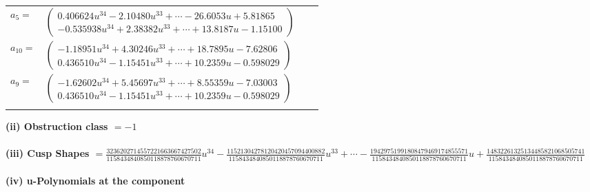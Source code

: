\documentclass[1p]{elsarticle_modified}
\theoremstyle{definition}
\begin{document}
\begin{tabular}{m{7pt} m{180pt} m{7pt} m{180pt} }
\flushright $a_{5}=$&$\begin{pmatrix}0.406624 u^{34}-2.10480 u^{33}+\cdots-26.6053 u+5.81865\\-0.535938 u^{34}+2.38382 u^{33}+\cdots+13.8187 u-1.15100\end{pmatrix}$ \\
\flushright $a_{10}=$&$\begin{pmatrix}-1.18951 u^{34}+4.30246 u^{33}+\cdots+18.7895 u-7.62806\\0.436510 u^{34}-1.15451 u^{33}+\cdots+10.2359 u-0.598029\end{pmatrix}$ \\
\flushright $a_{9}=$&$\begin{pmatrix}-1.62602 u^{34}+5.45697 u^{33}+\cdots+8.55359 u-7.03003\\0.436510 u^{34}-1.15451 u^{33}+\cdots+10.2359 u-0.598029\end{pmatrix}$\\&\end{tabular}
\flushleft \textbf{(ii) Obstruction class $= -1$}\\~\\
\flushleft \textbf{(iii) Cusp Shapes $= \frac{3236202714557221663667427502}{1158434840850118878760670711} u^{34}-\frac{11521304278120420457094400882}{1158434840850118878760670711} u^{33}+\cdots-\frac{19429751991808479469174855571}{1158434840850118878760670711} u+\frac{14832261325134485821068505741}{1158434840850118878760670711}$}\\~\\
\newpage\renewcommand{\arraystretch}{1}
\flushleft \textbf{(iv) u-Polynomials at the component}\newline \\
\end{document}
